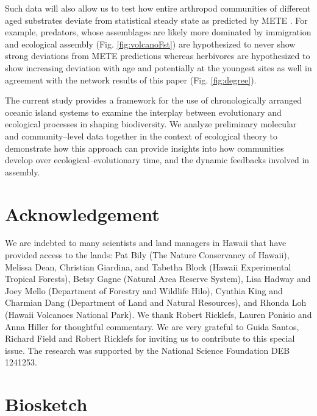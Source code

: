 \documentclass[12pt]{article}
\begin{document}
\begin{linenumbers}
Such data will also allow us to test how entire arthropod communities
of different aged substrates deviate from statistical steady state as
predicted by METE \citep{harte2011}. For example, predators, whose
assemblages are likely more dominated by immigration and ecological
assembly (Fig. \ref{fig:volcanoFst}) are hypothesized to never show
strong deviations from METE predictions whereas herbivores are
hypothesized to show increasing deviation with age and potentially at
the youngest sites as well in agreement with the network results of
this paper (Fig. \ref{fig:degree}).

The current study provides a framework for the use of chronologically
arranged oceanic island systems to examine the interplay between
evolutionary and ecological processes in shaping biodiversity. We
analyze preliminary molecular and community--level data together in
the context of ecological theory to demonstrate how this approach can
provide insights into how communities develop over
ecological--evolutionary time, and the dynamic feedbacks involved in
assembly.


\section*{Acknowledgement}
We are indebted to many scientists and land managers in Hawaii that
have provided access to the lands: Pat Bily (The Nature Conservancy of
Hawaii), Melissa Dean, Christian Giardina, and Tabetha Block (Hawaii
Experimental Tropical Forests), Betsy Gagne (Natural Area Reserve
System), Lisa Hadway and Joey Mello (Department of Forestry and
Wildlife Hilo), Cynthia King and Charmian Dang (Department of Land and
Natural Resources), and Rhonda Loh (Hawaii Volcanoes National
Park). We thank Robert Ricklefs, Lauren Ponisio and Anna Hiller for
thoughtful commentary. We are very grateful to Guida Santos, Richard
Field and Robert Ricklefs for inviting us to contribute to this
special issue. The research was supported by the National Science
Foundation DEB 1241253.





\clearpage

\section*{Biosketch}


\end{linenumbers}
\end{document}
